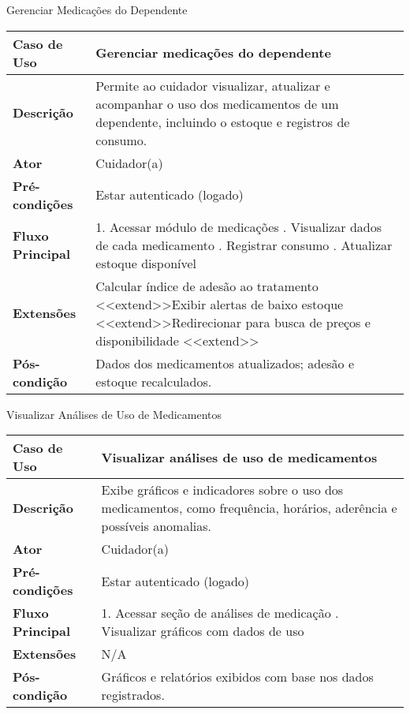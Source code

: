 \begin{quadro}
    \caption{\label{quadro_gerenciar_medicacoes}Gerenciar Medicações do Dependente}
    \begin{tabular}{|l|p{12cm}|}
        \hline
        \textbf{Caso de Uso} & Gerenciar medicações do dependente \\ \hline
        \textbf{Descrição} & Permite ao cuidador visualizar, atualizar e acompanhar o uso dos medicamentos de um dependente, incluindo o estoque e registros de consumo. \\ \hline
        \textbf{Ator} & Cuidador(a) \\ \hline
        \textbf{Pré-condições} & Estar autenticado (logado) \\ \hline
        \textbf{Fluxo Principal} & 1. Acessar módulo de medicações \newline 2. Visualizar dados de cada medicamento \newline 3. Registrar consumo \newline 4. Atualizar estoque disponível \\ \hline
        \textbf{Extensões} & Calcular índice de adesão ao tratamento \textless\textless extend\textgreater\textgreater \newline Exibir alertas de baixo estoque \textless\textless extend\textgreater\textgreater \newline Redirecionar para busca de preços e disponibilidade \textless\textless extend\textgreater\textgreater \\ \hline
        \textbf{Pós-condição} & Dados dos medicamentos atualizados; adesão e estoque recalculados. \\ \hline
    \end{tabular}
\end{quadro}


\begin{quadro}
    \caption{\label{quadro_visualizar_analises_medicamentos}Visualizar Análises de Uso de Medicamentos}
    \begin{tabular}{|l|p{12cm}|}
        \hline
        \textbf{Caso de Uso} & Visualizar análises de uso de medicamentos \\ \hline
        \textbf{Descrição} & Exibe gráficos e indicadores sobre o uso dos medicamentos, como frequência, horários, aderência e possíveis anomalias. \\ \hline
        \textbf{Ator} & Cuidador(a) \\ \hline
        \textbf{Pré-condições} & Estar autenticado (logado) \\ \hline
        \textbf{Fluxo Principal} & 1. Acessar seção de análises de medicação \newline 2. Visualizar gráficos com dados de uso \\ \hline
        \textbf{Extensões} & N/A \\ \hline
        \textbf{Pós-condição} & Gráficos e relatórios exibidos com base nos dados registrados. \\ \hline
    \end{tabular}
\end{quadro}


